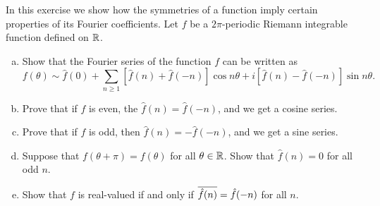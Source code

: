 \begin{exrc}[2]
    In this exercise we show how the symmetries of a function imply certain
    properties of its Fourier coefficients.
    Let \(f\) be a \(2\pi\)-periodic Riemann integrable function defined on \(\mathbb{R}\).
    \begin{enumerate}[(a)]
    \item
        Show that the Fourier series of the function \(f\) can be written as
        \begin{equation*}
            f(\theta) \sim \hat{f}(0) + \sum_{n \geq 1}^{} [ \hat{f}(n) + \hat{f}(-n)]
            \cos n\theta + i [ \hat{f}(n) - \hat{f}(-n) ] \sin n\theta.
        \end{equation*}
    \item
        Prove that if \(f\) is even, the \(\hat{f}(n) = \hat{f}(-n)\), and we get a cosine series.
    \item
        Prove that if \(f\) is odd, then \(\hat{f}(n) = -\hat{f}(-n)\), and we get a sine series.
    \item
        Suppose that \(f(\theta + \pi) = f(\theta)\) for all \(\theta \in \mathbb{R}\).
        Show that \(\hat{f}(n) = 0\) for all odd \(n\).
    \item
        Show that \(f\) is real-valued if and only if \(\overline{\hat{f}(n)} = \hat{f}(-n)\) for all \(n\).
    \end{enumerate}


\end{exrc}
